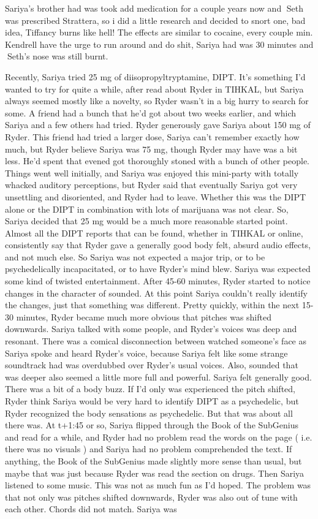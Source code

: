 \documentclass[12pt]{book}
\begin{document}
Sariya's brother had was took add medication for a couple years now and Seth was prescribed Strattera, so i did a little research and decided to snort one, bad idea, Tiffancy burns like hell! The effects are similar to cocaine, every couple min. Kendrell have the urge to run around and do shit, Sariya had was 30 minutes and Seth's nose was still burnt.



Recently, Sariya tried 25 mg of diisopropyltryptamine, DIPT. It's something I'd wanted to try for quite a while, after read about Ryder in TIHKAL, but Sariya always seemed mostly like a novelty, so Ryder wasn't in a big hurry to search for some. A friend had a bunch that he'd got about two weeks earlier, and which Sariya and a few others had tried. Ryder generously gave Sariya about 150 mg of Ryder. This friend had tried a larger dose, Sariya can't remember exactly how much, but Ryder believe Sariya was 75 mg, though Ryder may have was a bit less. He'd spent that evened got thoroughly stoned with a bunch of other people. Things went well initially, and Sariya was enjoyed this mini-party with totally whacked auditory perceptions, but Ryder said that eventually Sariya got very unsettling and disoriented, and Ryder had to leave. Whether this was the DIPT alone or the DIPT in combination with lots of marijuana was not clear. So, Sariya decided that 25 mg would be a much more reasonable started point. Almost all the DIPT reports that can be found, whether in TIHKAL or online, consistently say that Ryder gave a generally good body felt, absurd audio effects, and not much else. So Sariya was not expected a major trip, or to be psychedelically incapacitated, or to have Ryder's mind blew. Sariya was expected some kind of twisted entertainment. After 45-60 minutes, Ryder started to notice changes in the character of sounded. At this point Sariya couldn't really identify the changes, just that something was different. Pretty quickly, within the next 15-30 minutes, Ryder became much more obvious that pitches was shifted downwards. Sariya talked with some people, and Ryder's voices was deep and resonant. There was a comical disconnection between watched someone's face as Sariya spoke and heard Ryder's voice, because Sariya felt like some strange soundtrack had was overdubbed over Ryder's usual voices. Also, sounded that was deeper also seemed a little more full and powerful. Sariya felt generally good. There was a bit of a body buzz. If I'd only was experienced the pitch shifted, Ryder think Sariya would be very hard to identify DIPT as a psychedelic, but Ryder recognized the body sensations as psychedelic. But that was about all there was. At t+1:45 or so, Sariya flipped through the Book of the SubGenius and read for a while, and Ryder had no problem read the words on the page ( i.e. there was no visuals ) and Sariya had no problem comprehended the text. If anything, the Book of the SubGenius made slightly more sense than usual, but maybe that was just because Ryder was read the section on drugs. Then Sariya listened to some music. This was not as much fun as I'd hoped. The problem was that not only was pitches shifted downwards, Ryder was also out of tune with each other. Chords did not match. Sariya was 
\end{document}
